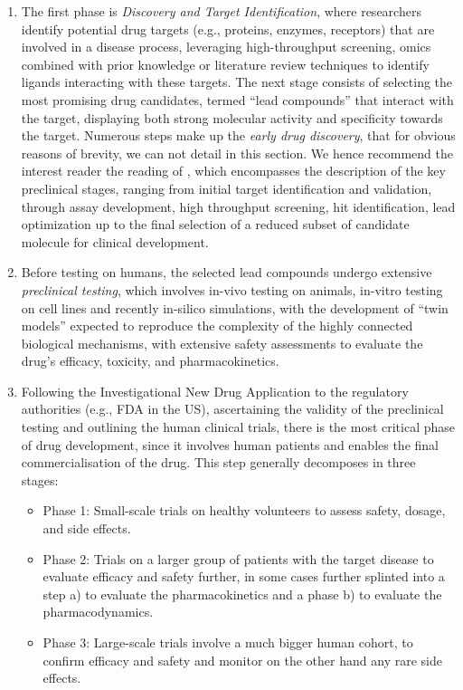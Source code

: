 \begin{enumerate}

\item The first phase is \emph{Discovery and Target Identification}, where researchers identify potential drug targets (e.g., proteins, enzymes, receptors) that are involved in a disease process, leveraging high-throughput screening, omics combined with prior knowledge or literature review  techniques to identify ligands interacting with these targets. The next stage consists of selecting the most promising drug candidates, termed \enquote{lead compounds} that interact with the target, displaying both strong molecular activity and specificity towards the target. Numerous steps make up the \emph{early drug discovery}, that for obvious reasons of brevity, we can not detail in this section. We hence recommend the interest reader the reading of \autocite{hughes_etal11}, which encompasses the description of the key preclinical stages, ranging from initial target identification and validation, through assay development, high throughput screening, hit identification, lead optimization up to the final selection of a reduced subset of candidate molecule for clinical development.

\item Before testing on humans, the selected lead compounds undergo extensive \emph{preclinical testing}, which involves in-vivo testing on animals, in-vitro testing on cell lines and recently in-silico simulations, with the development of \enquote{twin models} expected to reproduce the complexity of the highly connected biological mechanisms, with extensive safety assessments to evaluate the drug's efficacy, toxicity, and pharmacokinetics.

\item Following the Investigational New Drug Application to the regulatory authorities (e.g., FDA in the US), ascertaining the validity of the preclinical testing and outlining the human clinical trials, there is the most critical phase of drug development, since it involves human patients and enables the final commercialisation of the drug. This step generally decomposes in three stages:

\begin{itemize}
\item  Phase 1: Small-scale trials on healthy volunteers to assess safety, dosage, and side effects.
\item Phase 2: Trials on a larger group of patients with the target disease to evaluate efficacy and safety further, in some cases further splinted into a step a) to evaluate the pharmacokinetics and a phase b) to evaluate the pharmacodynamics. 
\item Phase 3: Large-scale trials involve a much bigger human cohort, to confirm efficacy and safety and monitor on the other hand any rare side effects.
\end{itemize}


\end{enumerate}
